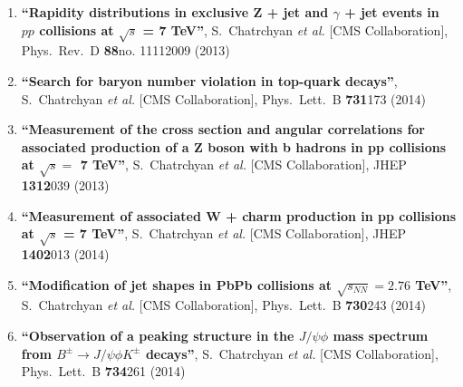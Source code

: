 \begin{enumerate}
\item%
{\bf ``Rapidity distributions in exclusive Z + jet and $\gamma$ + jet events in $pp$ collisions at $\sqrt{s}$ = 7 TeV''}, 
  S.~Chatrchyan {\it et al.}  [CMS Collaboration], 
Phys.\ Rev.\ D {\bf 88}no. 11112009 (2013) %


\item%
{\bf ``Search for baryon number violation in top-quark decays''}, 
  S.~Chatrchyan {\it et al.}  [CMS Collaboration], 
Phys.\ Lett.\ B {\bf 731}173 (2014) %


\item%
{\bf ``Measurement of the cross section and angular correlations for associated production of a Z boson with b hadrons in pp collisions at $\sqrt{s} =$ 7 TeV''}, 
  S.~Chatrchyan {\it et al.}  [CMS Collaboration], 
JHEP {\bf 1312}039 (2013) %


\item%
{\bf ``Measurement of associated W + charm production in pp collisions at $\sqrt{s}$ = 7 TeV''}, 
  S.~Chatrchyan {\it et al.}  [CMS Collaboration], 
JHEP {\bf 1402}013 (2014) %


\item%
{\bf ``Modification of jet shapes in PbPb collisions at $\sqrt {s_{NN}} = 2.76$ TeV''}, 
  S.~Chatrchyan {\it et al.}  [CMS Collaboration], 
Phys.\ Lett.\ B {\bf 730}243 (2014) %


\item%
{\bf ``Observation of a peaking structure in the $J/\psi \phi$ mass spectrum from $B^{\pm} \to J/\psi \phi K^{\pm}$ decays''}, 
  S.~Chatrchyan {\it et al.}  [CMS Collaboration], 
Phys.\ Lett.\ B {\bf 734}261 (2014) %



\end{enumerate}
